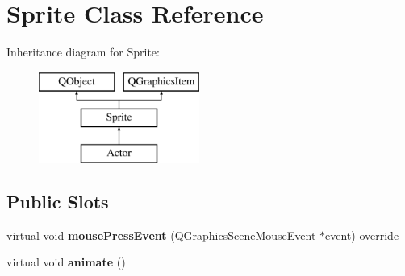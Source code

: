 \hypertarget{class_sprite}{}\section{Sprite Class Reference}
\label{class_sprite}
Inheritance diagram for Sprite\+:\begin{figure}[H]
\begin{center}
\leavevmode
\includegraphics[height=3.000000cm]{class_sprite}
\end{center}
\end{figure}
\subsection*{Public Slots}
\begin{DoxyCompactItemize}
\item 
\mbox{\label{class_sprite_ab76c12803dcd1f7a44c4acbbec91380d}} 
virtual void {\bfseries mouse\+Press\+Event} (Q\+Graphics\+Scene\+Mouse\+Event $\ast$event) override
\item 
\mbox{\label{class_sprite_a8935559355be47d8ba7e7eb175aecdb5}} 
virtual void {\bfseries animate} ()
\end{DoxyCompactItemize}
